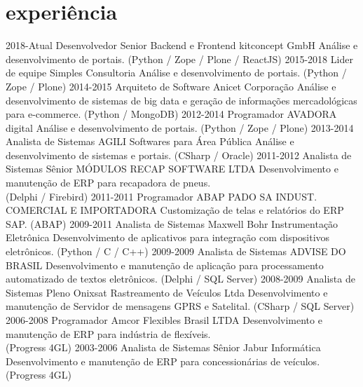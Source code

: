 \documentclass[]{twentysecondcv}
\begin{document}
\section{experiência}

\begin{twenty}
  \twentyitem
    {2018-Atual}
    {Desenvolvedor Senior Backend e Frontend}
    {kitconcept GmbH}
    {Análise e desenvolvimento de portais. (Python / Zope / Plone / ReactJS)}
  \twentyitem
    {2015-2018}
    {Lider de equipe}
    {Simples Consultoria}
    {Análise e desenvolvimento de portais. (Python / Zope / Plone)}
  \twentyitem
    {2014-2015}
    {Arquiteto de Software}
    {Anicet Corporação}
    {Análise e desenvolvimento de sistemas de big data e geração de informações mercadológicas para e-commerce. (Python / MongoDB)}
  \twentyitem
    {2012-2014}
    {Programador}
    {AVADORA digital}
    {Análise e desenvolvimento de portais. (Python / Zope / Plone)}
  \twentyitem
    {2013-2014}
    {Analista de Sistemas}
    {AGILI Softwares para Área Pública}
    {Análise e desenvolvimento de sistemas e portais. (CSharp / Oracle)}
  \twentyitem
    {2011-2012}
    {Analista de Sistemas Sênior}
    {MÓDULOS RECAP SOFTWARE LTDA}
    {Desenvolvimento e manutenção de ERP para recapadora de pneus.\\
    (Delphi / Firebird)}
  \twentyitem
    {2011-2011}
    {Programador ABAP}
    {PADO SA INDUST. COMERCIAL E IMPORTADORA}
    {Customização de telas e relatórios do ERP SAP. (ABAP)}
  \twentyitem
    {2009-2011}
    {Analista de Sistemas}
    {Maxwell Bohr Instrumentação Eletrônica}
    {Desenvolvimento de aplicativos para integração com dispositivos eletrônicos. (Python / C / C++)}
  \twentyitem
    {2009-2009}
    {Analista de Sistemas}
    {ADVISE DO BRASIL}
    {Desenvolvimento e manutenção de aplicação para processamento automatizado de textos eletrônicos. (Delphi / SQL Server)}
  \twentyitem
    {2008-2009}
    {Analista de Sistemas Pleno}
    {Onixsat Rastreamento de Veículos Ltda}
    {Desenvolvimento e manutenção de Servidor de mensagens GPRS e Satelital. (CSharp / SQL Server)}
  \twentyitem
    {2006-2008}
    {Programador}
    {Amcor Flexibles Brasil LTDA}
    {Desenvolvimento e manutenção de ERP para indústria de flexíveis.\\
    (Progress 4GL)}
  \twentyitem
    {2003-2006}
    {Analista de Sistemas Sênior}
    {Jabur Informática}
    {Desenvolvimento e manutenção de ERP para concessionárias de veículos.\\
    (Progress 4GL)}
\end{twenty}
\end{document}
